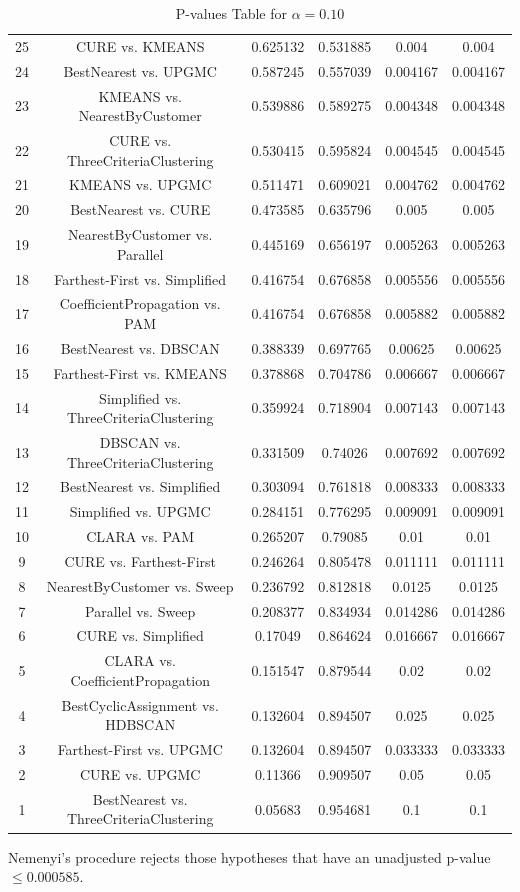 \documentclass[a4paper,10pt]{article}
\begin{document}
\begin{landscape}
\begin{table}[!htp]
\begin{tabular}{cccccc}
25&CURE vs. KMEANS&0.625132&0.531885&0.004&0.004\\
24&BestNearest vs. UPGMC&0.587245&0.557039&0.004167&0.004167\\
23&KMEANS vs. NearestByCustomer&0.539886&0.589275&0.004348&0.004348\\
22&CURE vs. ThreeCriteriaClustering&0.530415&0.595824&0.004545&0.004545\\
21&KMEANS vs. UPGMC&0.511471&0.609021&0.004762&0.004762\\
20&BestNearest vs. CURE&0.473585&0.635796&0.005&0.005\\
19&NearestByCustomer vs. Parallel&0.445169&0.656197&0.005263&0.005263\\
18&Farthest-First vs. Simplified&0.416754&0.676858&0.005556&0.005556\\
17&CoefficientPropagation vs. PAM&0.416754&0.676858&0.005882&0.005882\\
16&BestNearest vs. DBSCAN&0.388339&0.697765&0.00625&0.00625\\
15&Farthest-First vs. KMEANS&0.378868&0.704786&0.006667&0.006667\\
14&Simplified vs. ThreeCriteriaClustering&0.359924&0.718904&0.007143&0.007143\\
13&DBSCAN vs. ThreeCriteriaClustering&0.331509&0.74026&0.007692&0.007692\\
12&BestNearest vs. Simplified&0.303094&0.761818&0.008333&0.008333\\
11&Simplified vs. UPGMC&0.284151&0.776295&0.009091&0.009091\\
10&CLARA vs. PAM&0.265207&0.79085&0.01&0.01\\
9&CURE vs. Farthest-First&0.246264&0.805478&0.011111&0.011111\\
8&NearestByCustomer vs. Sweep&0.236792&0.812818&0.0125&0.0125\\
7&Parallel vs. Sweep&0.208377&0.834934&0.014286&0.014286\\
6&CURE vs. Simplified&0.17049&0.864624&0.016667&0.016667\\
5&CLARA vs. CoefficientPropagation&0.151547&0.879544&0.02&0.02\\
4&BestCyclicAssignment vs. HDBSCAN&0.132604&0.894507&0.025&0.025\\
3&Farthest-First vs. UPGMC&0.132604&0.894507&0.033333&0.033333\\
2&CURE vs. UPGMC&0.11366&0.909507&0.05&0.05\\
1&BestNearest vs. ThreeCriteriaClustering&0.05683&0.954681&0.1&0.1\\
\hline
\end{tabular}
\caption{P-values Table for $\alpha=0.10$}
\end{table}Nemenyi's procedure rejects those hypotheses that have an unadjusted p-value $\le0.000585$.


\end{landscape}
\end{document}
